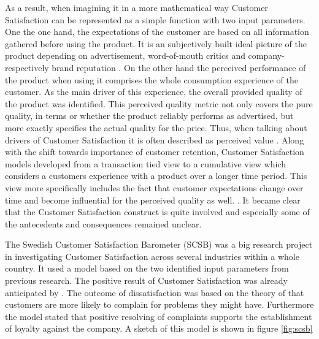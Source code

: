 As a result, when imagining it in a more mathematical way Customer Satisfaction can be represented as a simple function with two input parameters. One the one hand, the expectations of the customer are based on all information gathered before using the product. It is an subjectively built ideal picture of the product depending on advertisement, word-of-mouth critics and company- respectively brand reputation \cite{johnson2001evolution} \cite{neckel2015}. On the other hand the perceived performance of the product when using it comprises the whole consumption experience of the customer. As the main driver of this experience, the overall provided quality of the product was identified. This perceived quality metric not only covers the pure quality, in terms or whether the product reliably performs as advertised, but more exactly specifies the actual quality for the price. Thus, when talking about drivers of Customer Satisfaction it is often described as perceived value \cite{johnson2001evolution} \cite{fornell1992national}. Along with the shift towards importance of customer retention, Customer Satisfaction models developed from a transaction tied view to a cumulative view which considers a customers experience with a product over a longer time period. This view more specifically includes the fact that customer expectations change over time and become influential for the perceived quality as well. \cite{johnson1996expectations}. It became clear that the Customer Satisfaction construct is quite involved and especially some of the antecedents and consequences remained unclear. 

The Swedish Customer Satisfaction Barometer (SCSB) was a big research project in investigating Customer Satisfaction across several industries within a whole country. It used a model based on the two identified input parameters from previous research. The positive result of Customer Satisfaction was already anticipated by \cite{bolton1998dynamic} \cite{gustafsson2005effects}. The outcome of dissatisfaction was based on the theory of \cite{hulett1971exit} that customers are more likely to complain for problems they might have. Furthermore the model stated that positive resolving of complaints supports the establishment of loyalty against the company. A sketch of this model is shown in figure \ref{fig:scsb}

